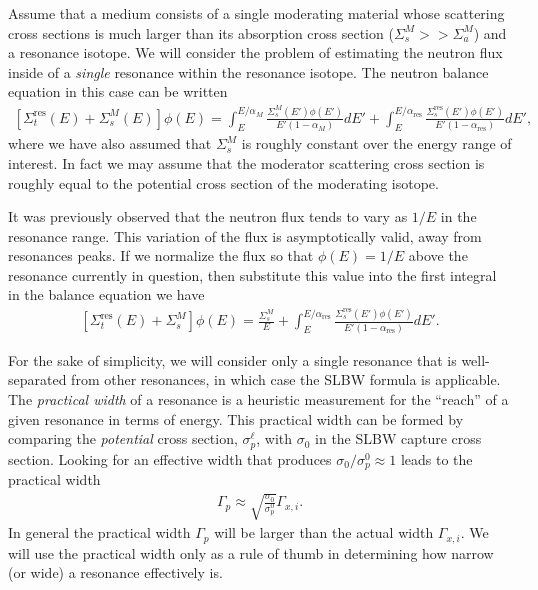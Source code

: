 \documentclass[11pt]{article}
\begin{document}
Assume that a medium consists of a single moderating material whose scattering cross sections is much larger than its absorption cross section (\(\Sigma_s^M >> \Sigma_a^M\)) and a resonance isotope.  We will consider the problem of estimating the neutron flux inside of a \emph{single} resonance within the resonance isotope.  The neutron balance equation in this case can be written
\begin{align}
  \left[ \Sigma_t^\text{res}(E) + \Sigma_s^M(E) \right] \phi(E)
  = \int_E^{E/\alpha_M} \frac{\Sigma_s^M(E') \phi(E')}{E'(1-\alpha_M)} dE'
  + \int_E^{E/\alpha_\text{res}} \frac{\Sigma_s^\text{res}(E') \phi(E')}{E'(1-\alpha_\text{res})} dE',
\end{align}
where we have also assumed that \(\Sigma_s^M\) is roughly constant over the energy range of interest.  In fact we may assume that the moderator scattering cross section is roughly equal to the potential cross section of the moderating isotope.

It was previously observed that the neutron flux tends to vary as \(1/E\) in the resonance range.  This variation of the flux is asymptotically valid, away from resonances peaks.  If we normalize the flux so that \(\phi(E) = 1/E\) above the resonance currently in question, then substitute this value into the first integral in the balance equation we have
\begin{align}
  \left[ \Sigma_t^\text{res}(E) + \Sigma_s^M \right] \phi(E)
  = \frac{\Sigma_s^M}{E} +
    \int_E^{E/\alpha_\text{res}} \frac{\Sigma_s^\text{res}(E') \phi(E')}{E'(1-\alpha_\text{res})} dE'.
\end{align}

For the sake of simplicity, we will consider only a single resonance that is well-separated from other resonances, in which case the SLBW formula is applicable.  The \emph{practical width} of a resonance is a heuristic measurement for the ``reach'' of a given resonance in terms of energy.  This practical width can be formed by comparing the \emph{potential} cross section, \(\sigma_p^\ell\), with \(\sigma_0\) in the SLBW capture cross section.  Looking for an effective width that produces \(\sigma_0/\sigma_p^0 \approx 1\) leads to the practical width
\begin{align}
  \Gamma_p \approx \sqrt{\frac{\sigma_0}{\sigma_p^0}} \Gamma_{x,i}.
\end{align}
In general the practical width \(\Gamma_p\) will be larger than the actual width \(\Gamma_{x,i}\).  We will use the practical width only as a rule of thumb in determining how narrow (or wide) a resonance effectively is.
\end{document}
